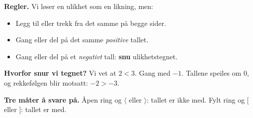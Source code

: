 \begin{mustkunne}
\begin{minipage}[t]{0.46\linewidth}
\textbf{Regler.} Vi løser en ulikhet som en likning, men:
\begin{itemize}[leftmargin=1.2em,itemsep=1pt,topsep=2pt]
  \item Legg til eller trekk fra det samme på begge sider.
  \item Gang eller del på det samme \emph{positive} tallet.
  \item Gang eller del på et \emph{negativt} tall: \textbf{snu} ulikhetstegnet.
\end{itemize}
\end{minipage}\hfill
\begin{minipage}[t]{0.50\linewidth}
\textbf{Hvorfor snur vi tegnet?} Vi vet at $2 < 3$. Gang med $-1$. Tallene speiles om 0, og rekkefølgen blir motsatt: $-2 > -3$.

\medskip
{}
\end{minipage}

\medskip
\textbf{Tre måter å svare på.} Åpen ring og $\langle$ eller $\rangle$: tallet er ikke med. Fylt ring og $[$ eller $]$: tallet er med.
\renewcommand{\arraystretch}{1.3}


\end{mustkunne}
